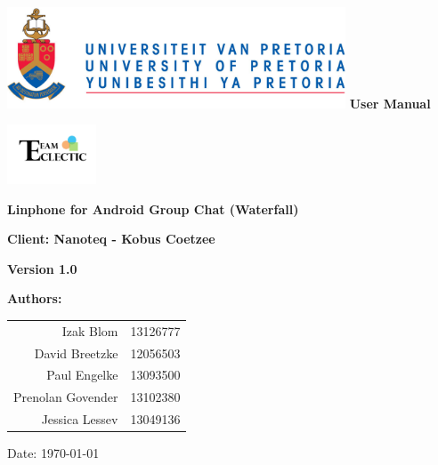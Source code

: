 \begin{titlepage}
\begin{flushright}

\includegraphics[width=380px]{../global/University_of_Pretoria_Logo.png}
\newline
\newline
\textbf {\LARGE User Manual} \newline


\centering\includegraphics[width=100px]{../global/Logo.jpg}


\textbf {\Large Linphone for Android Group Chat (Waterfall)}\newline

\textbf {\Large Client: Nanoteq - Kobus Coetzee}\newline

\textbf {\large Version 1.0}\newline

\centering \textbf {\large Authors:}

\begin{table}[H]
\large
\centering
\begin{tabular}{rl}
	Izak Blom & 13126777 \\
	David Breetzke & 12056503 \\
	Paul Engelke & 13093500 \\
	Prenolan Govender & 13102380 \\
	Jessica Lessev & 13049136 \\
\end{tabular}
\end{table}

Date: \today

\end{flushright}
\end{titlepage}